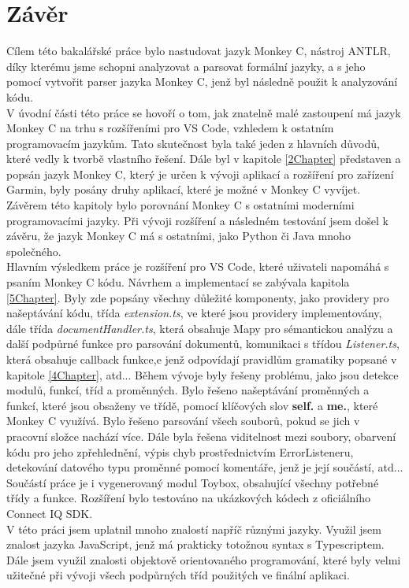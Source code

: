 \chapter{Závěr}
Cílem této bakalářské práce bylo nastudovat jazyk Monkey C, nástroj ANTLR, díky kterému jsme schopni analyzovat a parsovat formální jazyky, a s jeho pomocí vytvořit parser jazyka Monkey C, jenž byl následně použit k analyzování kódu. 
\\
V úvodní části této práce se hovoří o tom, jak znatelně malé zastoupení má jazyk Monkey C na trhu s rozšířeními pro VS Code, vzhledem k ostatním programovacím jazykům. Tato skutečnost byla také jeden z hlavních důvodů, které vedly k tvorbě vlastního řešení. Dále byl v kapitole \ref{2Chapter} představen a popsán jazyk Monkey C, který je určen k vývoji aplikací a rozšíření pro zařízení Garmin, byly posány druhy aplikací, které je možné v Monkey C vyvíjet. Závěrem této kapitoly bylo porovnání Monkey C s ostatními moderními programovacími jazyky. Při vývoji rozšíření a následném testování jsem došel k závěru, že jazyk Monkey C má s ostatními, jako Python či Java mnoho společného. 
\\
Hlavním výsledkem práce je rozšíření pro VS Code, které uživateli napomáhá s psaním Monkey C kódu. Návrhem a implementací se zabývala kapitola \ref{5Chapter}. Byly zde popsány všechny důležité komponenty, jako providery pro našeptávání kódu, třída \textit{extension.ts}, ve které jsou providery implementovány, dále třída \textit{documentHandler.ts}, která obsahuje Mapy pro sémantickou analýzu a další podpůrné funkce pro parsování dokumentů, komunikaci s třídou \textit{Listener.ts}, která obsahuje callback funkce,e jenž odpovídají pravidlům gramatiky popsané v kapitole \ref{4Chapter}, atd... Během vývoje byly řešeny problému, jako jsou detekce modulů, funkcí, tříd a proměnných. Bylo řešeno našeptávání proměnných a funkcí, které jsou obsaženy ve třídě, pomocí klíčových slov \textbf{self.} a \textbf{me.}, které Monkey C využívá. Bylo řešeno parsování všech souborů, pokud se jich v pracovní složce nachází více. Dále byla řešena viditelnost mezi soubory, obarvení kódu pro jeho zpřehlednění, výpis chyb prostřednictvím ErrorListeneru, detekování datového typu proměnné pomocí komentáře, jenž je její součástí, atd... Součástí práce je i vygenerovaný modul Toybox, obsahující všechny potřebné třídy a funkce. Rozšíření bylo testováno na ukázkových kódech z oficiálního Connect IQ SDK.
\\
V této práci jsem uplatnil mnoho znalostí napříč různými jazyky. Využil jsem znalost jazyka JavaScript, jenž má prakticky totožnou syntax s Typescriptem. Dále jsem využil znalosti objektově orientovaného programování, které byly velmi užitečné při vývoji všech podpůrných tříd použitých ve finální aplikaci.\\
